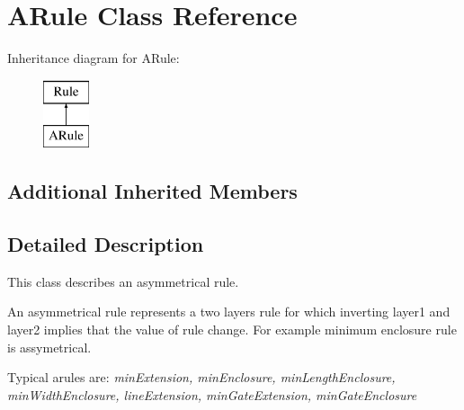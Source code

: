 \hypertarget{class_d_t_r_1_1_a_rule}{\section{A\-Rule Class Reference}
\label{class_d_t_r_1_1_a_rule}
}
Inheritance diagram for A\-Rule\-:\begin{figure}[H]
\begin{center}
\leavevmode
\includegraphics[height=2.000000cm]{class_d_t_r_1_1_a_rule}
\end{center}
\end{figure}
\subsection*{Additional Inherited Members}


\subsection{Detailed Description}
This class describes an asymmetrical rule.

An asymmetrical rule represents a two layers rule for which inverting layer1 and layer2 implies that the value of rule change. For example minimum enclosure rule is assymetrical.

Typical arules are\-: {\itshape min\-Extension, min\-Enclosure, min\-Length\-Enclosure, min\-Width\-Enclosure, line\-Extension, min\-Gate\-Extension, min\-Gate\-Enclosure} 